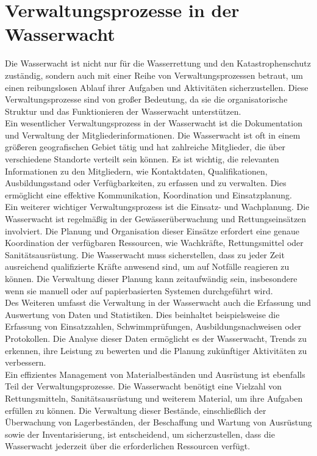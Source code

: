 \documentclass[fontsize=12pt,openright,oneside,paper=a4,BCOR=1cm]{scrbook}
\begin{document}
\section{Verwaltungsprozesse in der Wasserwacht}

Die Wasserwacht ist nicht nur für die Wasserrettung und den Katastrophenschutz zuständig, sondern auch mit einer Reihe von Verwaltungsprozessen betraut, um einen reibungslosen Ablauf ihrer Aufgaben und Aktivitäten sicherzustellen. Diese Verwaltungsprozesse sind von großer Bedeutung, da sie die organisatorische Struktur und das Funktionieren der Wasserwacht unterstützen.\\
Ein wesentlicher Verwaltungsprozess in der Wasserwacht ist die Dokumentation und Verwaltung der Mitgliederinformationen. Die Wasserwacht ist oft in einem größeren geografischen Gebiet tätig und hat zahlreiche Mitglieder, die über verschiedene Standorte verteilt sein können. Es ist wichtig, die relevanten Informationen zu den Mitgliedern, wie Kontaktdaten, Qualifikationen, Ausbildungsstand oder Verfügbarkeiten, zu erfassen und zu verwalten. Dies ermöglicht eine effektive Kommunikation, Koordination und Einsatzplanung. \\
Ein weiterer wichtiger Verwaltungsprozess ist die Einsatz- und Wachplanung. Die Wasserwacht ist regelmäßig in der Gewässerüberwachung und Rettungseinsätzen involviert. Die Planung und Organisation dieser Einsätze erfordert eine genaue Koordination der verfügbaren Ressourcen, wie Wachkräfte, Rettungsmittel oder Sanitätsausrüstung. Die Wasserwacht muss sicherstellen, dass zu jeder Zeit ausreichend qualifizierte Kräfte anwesend sind, um auf Notfälle reagieren zu können. Die Verwaltung dieser Planung kann zeitaufwändig sein, insbesondere wenn sie manuell oder auf papierbasierten Systemen durchgeführt wird. \\
Des Weiteren umfasst die Verwaltung in der Wasserwacht auch die Erfassung und Auswertung von Daten und Statistiken. Dies beinhaltet beispielsweise die Erfassung von Einsatzzahlen, Schwimmprüfungen, Ausbildungsnachweisen oder Protokollen. Die Analyse dieser Daten ermöglicht es der Wasserwacht, Trends zu erkennen, ihre Leistung zu bewerten und die Planung zukünftiger Aktivitäten zu verbessern. \\
Ein effizientes Management von Materialbeständen und Ausrüstung ist ebenfalls Teil der Verwaltungsprozesse. Die Wasserwacht benötigt eine Vielzahl von Rettungsmitteln, Sanitätsausrüstung und weiterem Material, um ihre Aufgaben erfüllen zu können. Die Verwaltung dieser Bestände, einschließlich der Überwachung von Lagerbeständen, der Beschaffung und Wartung von Ausrüstung sowie der Inventarisierung, ist entscheidend, um sicherzustellen, dass die Wasserwacht jederzeit über die erforderlichen Ressourcen verfügt. \\
\end{document}
